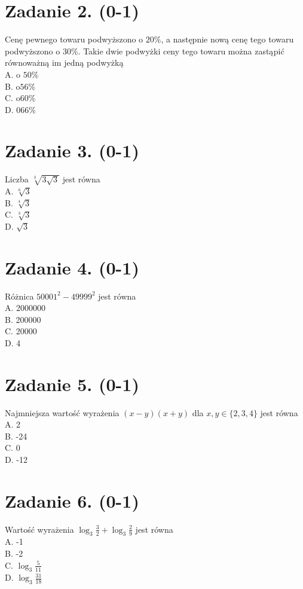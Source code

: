 \documentclass[10pt]{article}
\begin{document}
\section*{Zadanie 2. (0-1)}
Cenę pewnego towaru podwyższono o \(20 \%\), a następnie nową cenę tego towaru podwyższono o \(30 \%\). Takie dwie podwyżki ceny tego towaru można zastąpić równoważną im jedną podwyżką\\
A. o \(50 \%\)\\
B. \(\mathrm{o} 56 \%\)\\
C. \(\mathrm{o} 60 \%\)\\
D. \(066 \%\)

\section*{Zadanie 3. (0-1)}
Liczba \(\sqrt[3]{3 \sqrt{3}}\) jest równa\\
A. \(\sqrt[6]{3}\)\\
B. \(\sqrt[4]{3}\)\\
C. \(\sqrt[3]{3}\)\\
D. \(\sqrt{3}\)

\section*{Zadanie 4. (0-1)}
Różnica \(50001^{2}-49999^{2}\) jest równa\\
A. 2000000\\
B. 200000\\
C. 20000\\
D. 4

\section*{Zadanie 5. (0-1)}
Najmniejsza wartość wyrażenia \((x-y)(x+y)\) dla \(x, y \in\{2,3,4\}\) jest równa\\
A. 2\\
B. -24\\
C. 0\\
D. -12

\section*{Zadanie 6. (0-1)}
Wartość wyrażenia \(\log _{3} \frac{3}{2}+\log _{3} \frac{2}{9}\) jest równa\\
A. -1\\
B. -2\\
C. \(\log _{3} \frac{5}{11}\)\\
D. \(\log _{3} \frac{31}{18}\)
\end{document}
